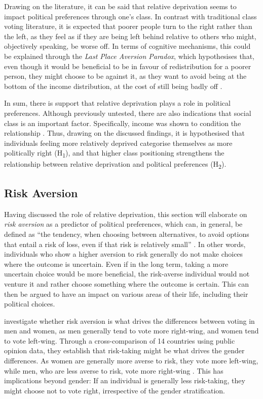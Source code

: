 \documentclass[stu,12pt]{apa7}
\begin{document}
Drawing on the literature, it can be said that relative deprivation seems to impact political preferences through one’s class. In contrast with traditional class voting literature, it is expected that poorer people turn to the right rather than the left, as they feel as if they are being left behind relative to others who might, objectively speaking, be worse off. In terms of cognitive mechanisms, this could be explained through the \textit{Last Place Aversion Paradox}, which hypothesises that, even though it would be beneficial to be in favour of redistribution for a poorer person, they might choose to be against it, as they want to avoid being at the bottom of the income distribution, at the cost of still being badly off \parencite{kuziemkoLastPlaceAversionEvidence2014}.

In sum, there is support that relative deprivation plays a role in political preferences. Although previously untested, there are also indications that social class is an important factor. Specifically, income was shown to condition the relationship \parencite{cenaRelativeDeprivationNational2023}. Thus, drawing on the discussed findings, it is hypothesised that individuals feeling more relatively deprived categorise themselves as more politically right (H\textsubscript{1}), and that higher class positioning strengthens the relationship between relative deprivation and political preferences (H\textsubscript{2}).

\subsection{Risk Aversion}

Having discussed the role of relative deprivation, this section will elaborate on \textit{risk aversion} as a predictor of political preferences, which can, in general, be defined as “the tendency, when choosing between alternatives, to avoid options that entail a risk of loss, even if that risk is relatively small” \parencite{Risk_aversion}. In other words, individuals who show a higher aversion to risk generally do not make choices where the outcome is uncertain. Even if in the long term, taking a more uncertain choice would be more beneficial, the risk-averse individual would not venture it and rather choose something where the outcome is certain. This can then be argued to have an impact on various areas of their life, including their political choices.

\textcite{oshriRiskAversionGender2023} investigate whether risk aversion is what drives the differences between voting in men and women, as men generally tend to vote more right-wing, and women tend to vote left-wing. Through a cross-comparison of 14 countries using public opinion data, they establish that risk-taking might be what drives the gender differences. As women are generally more averse to risk, they vote more left-wing, while men, who are less averse to risk, vote more right-wing \parencite{oshriRiskAversionGender2023}. This has implications beyond gender: If an individual is generally less risk-taking, they might choose not to vote right, irrespective of the gender stratification.
\end{document}
